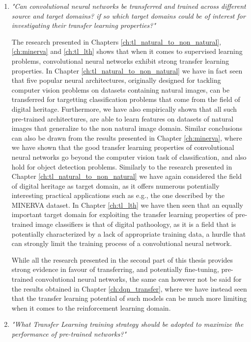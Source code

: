 \begin{enumerate}
	\item \textit{"Can convolutional neural networks be transferred and trained across different source and target domains? if so which target domains could be of interest for investigating their transfer learning properties?"}
	
	The research presented in Chapters \ref{ch:tl_natural_to_non_natural}, \ref{ch:minerva} and \ref{ch:tl_lth} shows that when it comes to supervised learning problems, convolutional neural networks exhibit strong transfer learning properties. In Chapter \ref{ch:tl_natural_to_non_natural} we have in fact seen that five popular neural architectures, originally designed for tackling computer vision problems on datasets containing natural images, can be transferred for targetting classification problems that come from the field of digital heritage. Furthermore, we have also empirically shown that all such pre-trained architectures, are able to learn features on datasets of natural images that generalize to the non natural image domain. Similar conclusions can also be drawn from the results presented in Chapter \ref{ch:minerva}, where we have shown that the good transfer learning properties of convolutional neural networks go beyond the computer vision task of classification, and also hold for object detection problems. Similarly to the research presented in Chapter \ref{ch:tl_natural_to_non_natural} we have again considered the field of digital heritage as target domain, as it offers numerous potentially interesting practical applications such as e.g., the one described by the MINERVA dataset. In Chapter \ref{ch:tl_lth} we have then seen that an equally important target domain for exploiting the transfer learning properties of pre-trained image classifiers is that of digital pathoology, as it is a field that is potentially characterized by a lack of appropriate training data, a hurdle that can strongly limit the training process of a convolutional neural network.

	While all the research presented in the second part of this thesis provides strong evidence in favour of transferring, and potentially fine-tuning, pre-trained convolutional neural networks, the same can however not be said for the results obtained in Chapter \ref{ch:dqn_transfer}, where we have instead seen that the transfer learning potential of such models can be much more limiting when it comes to the reinforcement learning domain. 

	
	\item \textit{"What Transfer Learning training strategy should be adopted to maximize the performance of pre-trained networks?"}


\end{enumerate}
